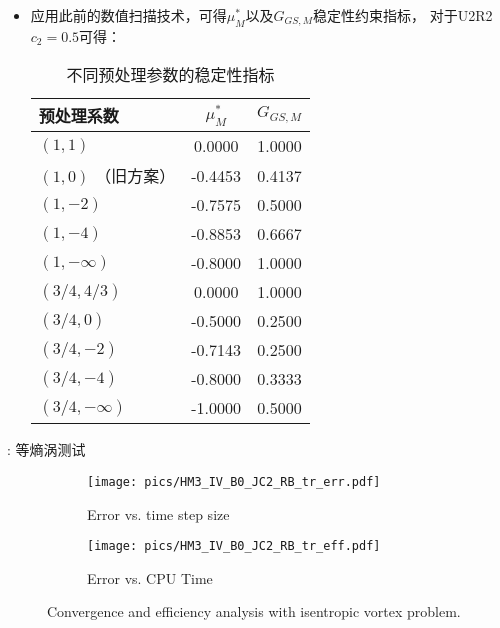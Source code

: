 \documentclass[aspectratio=169,serif]{beamer} %
\begin{document}
\begin{frame}{\secname}
  \begin{itemize}
    \item 应用此前的数值扫描技术，可得$\mu^*_M$以及$G_{GS,M}$稳定性约束指标，
          对于U2R2 $c_2=0.5$可得：
          \begin{table}[htbp]
            \scriptsize
            \centering
            \caption{不同预处理参数的稳定性指标}
            \label{tab:u2r2_beta1beta2samples}
            \begin{tabular}{lcc}
              \toprule
              预处理系数            & $\mu^*_M$ & $G_{GS,M}$ \\
              \midrule
              $(1, 1)$         & 0.0000    & 1.0000     \\
              $(1, 0)$ （旧方案）   & -0.4453   & 0.4137     \\
              $(1, -2)$        & -0.7575   & 0.5000     \\
              $(1, -4)$        & -0.8853   & 0.6667     \\
              $(1, -\infty)$   & -0.8000   & 1.0000     \\
              $(3/4, 4/3)$     & 0.0000    & 1.0000     \\
              $(3/4, 0)$       & -0.5000   & 0.2500     \\
              $(3/4, -2)$      & -0.7143   & 0.2500     \\
              $(3/4, -4)$      & -0.8000   & 0.3333     \\
              $(3/4, -\infty)$ & -1.0000   & 0.5000     \\
              \bottomrule
            \end{tabular}
          \end{table}
  \end{itemize}
\end{frame}


\begin{frame}{\secname: 等熵涡测试}
  \scriptsize
  \begin{figure}[htbp]
    \centering
    \begin{subfigure}{0.5\textwidth}
      \texttt{[image: pics/HM3\_IV\_B0\_JC2\_RB\_tr\_err.pdf]}
      \caption[]{Error vs. time step size}
      \label{sfig:IV_u2r2Pretest_err}
    \end{subfigure}\hfill
    \begin{subfigure}{0.5\textwidth}
      \texttt{[image: pics/HM3\_IV\_B0\_JC2\_RB\_tr\_eff.pdf]}
      \caption[]{Error vs. CPU Time}
      \label{sfig:IV_u2r2Pretest_eff}
    \end{subfigure}
    \caption[]{Convergence and efficiency analysis with isentropic vortex problem.}
    \label{fig:IV_u2r2Pretest}
  \end{figure}
\end{frame}
\end{document}
